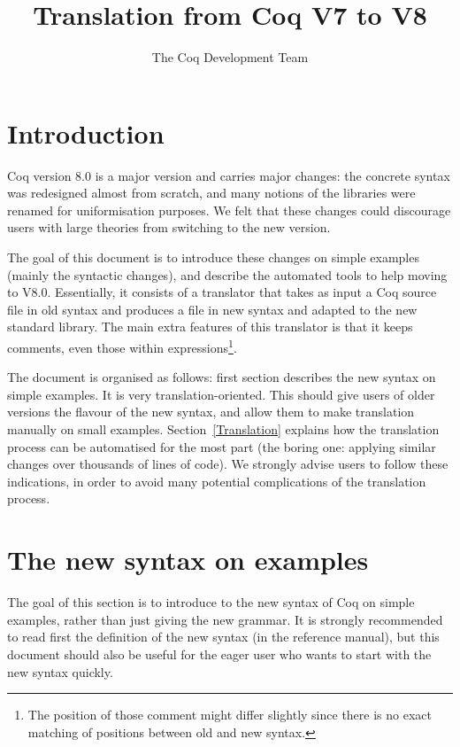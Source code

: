 \documentclass[11pt,a4paper]{article}
\title{Translation from Coq V7 to V8}
\author{The Coq Development Team}
\begin{document}
\maketitle

\section{Introduction}

Coq version 8.0 is a major version and carries major changes: the
concrete syntax was redesigned almost from scratch, and many notions
of the libraries were renamed for uniformisation purposes. We felt
that these changes could discourage users with large theories from
switching to the new version.

The goal of this document is to introduce these changes on simple
examples (mainly the syntactic changes), and describe the automated
tools to help moving to V8.0. Essentially, it consists of a translator
that takes as input a Coq source file in old syntax and produces a
file in new syntax and adapted to the new standard library. The main
extra features of this translator is that it keeps comments, even
those within expressions\footnote{The position of those comment might
differ slightly since there is no exact matching of positions between
old and new syntax.}.

The document is organised as follows: first section describes the new
syntax on simple examples. It is very translation-oriented. This
should give users of older versions the flavour of the new syntax, and
allow them to make translation manually on small
examples. Section~\ref{Translation} explains how the translation
process can be automatised for the most part (the boring one: applying
similar changes over thousands of lines of code). We strongly advise
users to follow these indications, in order to avoid many potential
complications of the translation process.


\section{The new syntax on examples}

The goal of this section is to introduce to the new syntax of Coq on
simple examples, rather than just giving the new grammar. It is
strongly recommended to read first the definition of the new syntax
(in the reference manual), but this document should also be useful for
the eager user who wants to start with the new syntax quickly.
\end{document}
